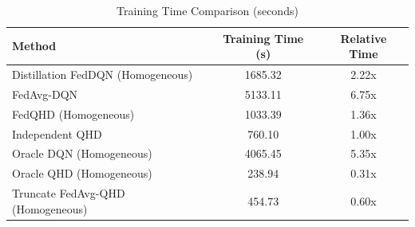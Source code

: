 \begin{table}[t]
\centering
\caption{Training Time Comparison (seconds)}
\label{tab:computation_cost}
\begin{tabular}{lcc}
\toprule
Method & Training Time (s) & Relative Time \\
\midrule
Distillation FedDQN (Homogeneous) & 1685.32 & 2.22x \\
FedAvg-DQN & 5133.11 & 6.75x \\
FedQHD (Homogeneous) & 1033.39 & 1.36x \\
Independent QHD & 760.10 & 1.00x \\
Oracle DQN (Homogeneous) & 4065.45 & 5.35x \\
Oracle QHD (Homogeneous) & 238.94 & 0.31x \\
Truncate FedAvg-QHD (Homogeneous) & 454.73 & 0.60x \\
\bottomrule
\end{tabular}
\end{table}